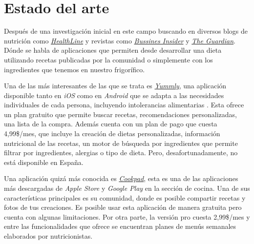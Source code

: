 \chapter{Estado del arte}
Después de una investigación inicial en este campo buscando en diversos blogs de nutrición como \href{https://www.healthline.com/nutrition/best-meal-planning-apps#6.-MyFoodMyHealth}{\emph{HealthLine}} y revistas como \href{https://www.businessinsider.es/mejores-apps-dieta-nutricion-gratis-877177}{\emph{Bussines Insider}} y \href{https://www.theguardian.com/technology/2016/jun/02/10-best-cookery-apps-iphone-ipad-android}{\emph{The Guardian}}. Dónde se habla de aplicaciones que permiten desde desarrollar una dieta utilizando recetas publicadas por la comunidad o simplemente con los ingredientes que tenemos en nuestro frigorífico. 

Una de las más interesantes de las que se trata es \href{https://www.yummly.com}{\emph{Yummly}}, una aplicación disponible tanto en \emph{iOS} como en \emph{Android} que se adapta a las necesidades individuales de cada persona, incluyendo intolerancias alimentarias \cite{TheGuardian2016}. Esta ofrece un plan gratuito que permite buscar recetas, recomendaciones personalizadas, una lista de la compra. Además cuenta con un plan de pago que cuesta 4,99\$/mes, que incluye la creación de dietas personalizadas, información nutricional de las recetas, un motor de búsqueda por ingredientes que permite filtrar por ingredientes, alergias o tipo de dieta. Pero, desafortunadamente, no está disponible en España. 

Una aplicación quizá más conocida es \href{https://cookpad.com/es/home}{\emph{Cookpad}}, esta es una de las aplicaciones más descargadas de \emph{Apple Store} y \emph{Google Play} en la sección de cocina. Una de sus características principales es su comunidad, donde es posible compartir recetas y fotos de tus creaciones. Es posible usar esta aplicación de manera gratuita pero cuenta con algunas limitaciones. Por otra parte, la versión pro cuesta 2,99\$/mes y entre las funcionalidades que ofrece se encuentran planes de menús semanales elaborados por nutricionistas.


